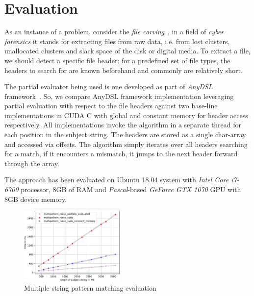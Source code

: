 \documentclass[sigplan,review,anonymous]{acmart}\settopmatter{printfolios=true,printccs=false,printacmref=false}
\newcommand\todo[1]{{\color{red}#1}}
\begin{document}



\section{Evaluation}

As an instance of a problem, consider the \textit{file carving}~\cite{DataCarving}, in a field of \textit{cyber forensics} it stands for extracting files from raw data, i.e. from lost clusters, unallocated clusters and slack space of the disk or digital media.
To extract a file, we should detect a specific file header: for a predefined set of file types, the headers to search for are known beforehand and commonly are relatively short.

The partial evaluator being used is one developed as part of \textit{AnyDSL} framework~\cite{LeiBa}.
So, we compare AnyDSL framework implementation leveraging partial evaluation with respect to the file headers against two base-line implementations in CUDA C with global and constant memory for header access respectively. 
All implementations invoke the algorithm in a separate thread for each position in the subject string.
The headers are stored as a single char-array and accessed via offsets.
The algorithm simply iterates over all headers searching for a match, if it encounters a mismatch, it jumps to the next header forward through the array.


The approach has been evaluated on Ubuntu 18.04 system with \textit{Intel Core i7-6700} processor, 8GB of RAM and \textit{Pascal}-based \textit{GeForce GTX 1070} GPU with 8GB device memory.

\begin{figure}[t]
  \centering
  \includegraphics[width=0.46\textwidth]{results.pdf}
  \caption{Multiple string pattern matching evaluation}
  \label{fig:eval}
\end{figure}
\end{document}
